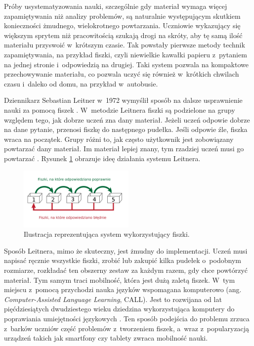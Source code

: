 \documentclass[a4paper,twoside,12pt]{book}
\newcommand{\obcy}[1]{\emph{#1}}
\newcommand{\english}[1]{{\selectlanguage{british}\obcy{#1}}}
\begin{document}


Próby usystematyzowania nauki, szczególnie gdy materiał wymaga więcej zapamiętywania niż analizy problemów, są naturalnie występującym skutkiem konieczności żmudnego, wielokrotnego powtarzania. Uczniowie wykazujący się większym sprytem niż pracowitością szukają drogi na skróty, aby tę samą ilość materiału przyswoić w~krótszym czasie. Tak powstały pierwsze metody technik zapamiętywania, na przykład fiszki, czyli niewielkie kawałki papieru z~pytaniem na jednej stronie i~odpowiedzią na drugiej. Taki system pozwala na kompaktowe przechowywanie materiału, co pozwala uczyć się również w~krótkich chwilach czasu i~daleko od domu, na przykład w~autobusie. 

Dziennikarz Sebastian Leitner w~1972 wymyślił sposób na dalsze usprawnienie nauki za pomocą fiszek \cite{bib:internetLeitner, bib:duolingoHLR}. W~metodzie Leitnera fiszki są podzielone na grupy względem tego, jak dobrze uczeń zna dany materiał. Jeżeli uczeń odpowie dobrze na dane pytanie, przenosi fiszkę do następnego pudełka. Jeśli odpowie źle, fiszka wraca na początek. Grupy różni to, jak często użytkownik jest zobowiązany powtarzać dany materiał. Im materiał lepiej znany, tym rzadziej uczeń musi go powtarzać \cite{bib:leitner}. Rysunek \ref{fig:leitner} obrazuje ideę działania systemu Leitnera.

\begin{figure}
\centering
\includegraphics[width=0.5\textwidth]{leitner_system}
\caption{Ilustracja reprezentująca system wykorzystujący fiszki.}
\label{fig:leitner}
\end{figure}

Sposób Leitnera, mimo że skuteczny, jest żmudny do implementacji. Uczeń musi napisać ręcznie wszystkie fiszki, zrobić lub zakupić kilka pudełek o~podobnym rozmiarze, rozkładać ten obszerny zestaw za każdym razem, gdy chce powtórzyć materiał. Tym samym traci mobilność, która jest dużą zaletą fiszek. W~tym miejscu z~pomocą przychodzi nauka języków wspomagana komputerowo (ang. {\english{Computer-Assisted Language Learning}}, CALL). Jest to rozwijana od lat pięćdziesiątych dwudziestego wieku dziedzina wykorzystująca komputery do poprawiania umiejętności językowych \citep{bib:beatty2013teaching}. Ten sposób podejścia do problemu zrzuca z~barków uczniów część problemów z~tworzeniem fiszek, a~wraz z~popularyzacją urządzeń takich jak smartfony czy tablety zwraca mobilność nauki. 
\end{document}
